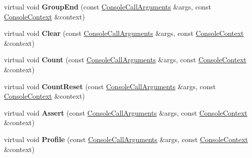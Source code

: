\begin{DoxyCompactItemize}
virtual void {\bfseries Group\+End} (const \mbox{\hyperlink{classv8_1_1debug_1_1ConsoleCallArguments}{Console\+Call\+Arguments}} \&args, const \mbox{\hyperlink{classv8_1_1debug_1_1ConsoleContext}{Console\+Context}} \&context)
\item 
\mbox{\label{classv8_1_1debug_1_1ConsoleDelegate_a92afd54c5a87746cc67775311a0cc951}} 
virtual void {\bfseries Clear} (const \mbox{\hyperlink{classv8_1_1debug_1_1ConsoleCallArguments}{Console\+Call\+Arguments}} \&args, const \mbox{\hyperlink{classv8_1_1debug_1_1ConsoleContext}{Console\+Context}} \&context)
\item 
\mbox{\label{classv8_1_1debug_1_1ConsoleDelegate_aecc695c0e984548144de54f86b9bd2f8}} 
virtual void {\bfseries Count} (const \mbox{\hyperlink{classv8_1_1debug_1_1ConsoleCallArguments}{Console\+Call\+Arguments}} \&args, const \mbox{\hyperlink{classv8_1_1debug_1_1ConsoleContext}{Console\+Context}} \&context)
\item 
\mbox{\label{classv8_1_1debug_1_1ConsoleDelegate_a21c79e3cbde5ee6df568fc6142e8f1f2}} 
virtual void {\bfseries Count\+Reset} (const \mbox{\hyperlink{classv8_1_1debug_1_1ConsoleCallArguments}{Console\+Call\+Arguments}} \&args, const \mbox{\hyperlink{classv8_1_1debug_1_1ConsoleContext}{Console\+Context}} \&context)
\item 
\mbox{\label{classv8_1_1debug_1_1ConsoleDelegate_a71b8bf699c12dad63ccedaec5bd5ac16}} 
virtual void {\bfseries Assert} (const \mbox{\hyperlink{classv8_1_1debug_1_1ConsoleCallArguments}{Console\+Call\+Arguments}} \&args, const \mbox{\hyperlink{classv8_1_1debug_1_1ConsoleContext}{Console\+Context}} \&context)
\item 
\mbox{\label{classv8_1_1debug_1_1ConsoleDelegate_a5fec73b3f492b46f14a8bfc3ff724856}} 
virtual void {\bfseries Profile} (const \mbox{\hyperlink{classv8_1_1debug_1_1ConsoleCallArguments}{Console\+Call\+Arguments}} \&args, const \mbox{\hyperlink{classv8_1_1debug_1_1ConsoleContext}{Console\+Context}} \&context)
\item 
\mbox{\label{classv8_1_1debug_1_1ConsoleDelegate_a3e0ef5398889102db80ee71801afb561}} 

\end{DoxyCompactItemize}
